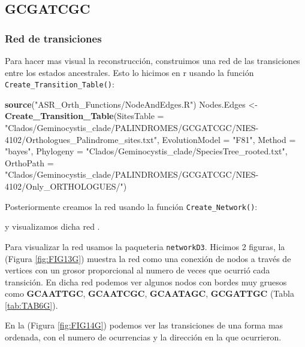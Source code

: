 \documentclass[
]{book}
\newenvironment{Shaded}{\begin{snugshade}}{\end{snugshade}}
\newcommand{\AttributeTok}[1]{\textcolor[rgb]{0.13,0.29,0.53}{#1}}
\newcommand{\FunctionTok}[1]{\textcolor[rgb]{0.13,0.29,0.53}{\textbf{#1}}}
\newcommand{\NormalTok}[1]{#1}
\newcommand{\OtherTok}[1]{\textcolor[rgb]{0.56,0.35,0.01}{#1}}
\newcommand{\StringTok}[1]{\textcolor[rgb]{0.31,0.60,0.02}{#1}}
\begin{document}
\hypertarget{gcgatcgc-2}{%
\subsection{GCGATCGC}\label{gcgatcgc-2}}

\hypertarget{red-de-transiciones-3}{%
\subsubsection{Red de transiciones}\label{red-de-transiciones-3}}

Para hacer mas visual la reconstrucción, construimos una red de las transiciones entre los estados ancestrales. Esto lo hicimos en r usando la función \texttt{Create\_Transition\_Table()}:

\begin{Shaded}
\begin{Highlighting}[]
\FunctionTok{source}\NormalTok{(}\StringTok{"ASR\_Orth\_Functions/NodeAndEdges.R"}\NormalTok{)}
\NormalTok{Nodes.Edges }\OtherTok{\textless{}{-}} \FunctionTok{Create\_Transition\_Table}\NormalTok{(}\AttributeTok{SitesTable =} \StringTok{"Clados/Geminocystis\_clade/PALINDROMES/GCGATCGC/NIES{-}4102/Orthologues\_Palindrome\_sites.txt"}\NormalTok{,}
                                \AttributeTok{EvolutionModel =} \StringTok{"F81"}\NormalTok{,}
                                \AttributeTok{Method =} \StringTok{"bayes"}\NormalTok{,}
                                \AttributeTok{Phylogeny =} \StringTok{"Clados/Geminocystis\_clade/SpeciesTree\_rooted.txt"}\NormalTok{,}
                                \AttributeTok{OrthoPath =} \StringTok{"Clados/Geminocystis\_clade/PALINDROMES/GCGATCGC/NIES{-}4102/Only\_ORTHOLOGUES/"}\NormalTok{)}
\end{Highlighting}
\end{Shaded}

Posteriormente creamos la red usando la función \texttt{Create\_Network()}:

y visualizamos dicha red .

Para visualizar la red usamos la paqueteria \texttt{networkD3}. Hicimos 2 figuras, la (Figura \ref{fig:FIG13G}) muestra la red como una conexión de nodos a través de vertices con un grosor proporcional al numero de veces que ocurrió cada transición. En dicha red podemos ver algunos nodos con bordes muy gruesos como \textbf{GCAATTGC}, \textbf{GCAATCGC}, \textbf{GCAATAGC}, \textbf{GCGATTGC} (Tabla \ref{tab:TAB6G}).

En la (Figura \ref{fig:FIG14G}) podemos ver las transiciones de una forma mas ordenada, con el numero de ocurrencias y la dirección en la que ocurrieron.
\end{document}
